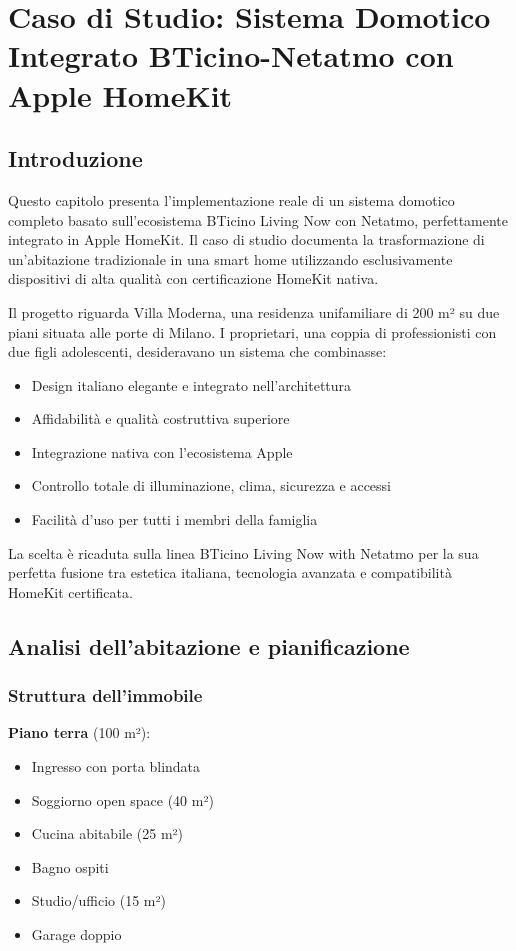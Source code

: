 \chapter{Caso di Studio: Sistema Domotico Integrato BTicino-Netatmo con Apple HomeKit}

\section{Introduzione}

Questo capitolo presenta l'implementazione reale di un sistema domotico completo basato sull'ecosistema BTicino Living Now con Netatmo, perfettamente integrato in Apple HomeKit. Il caso di studio documenta la trasformazione di un'abitazione tradizionale in una smart home utilizzando esclusivamente dispositivi di alta qualità con certificazione HomeKit nativa.

Il progetto riguarda Villa Moderna, una residenza unifamiliare di 200 m² su due piani situata alle porte di Milano. I proprietari, una coppia di professionisti con due figli adolescenti, desideravano un sistema che combinasse:

\begin{itemize}
    \item Design italiano elegante e integrato nell'architettura
    \item Affidabilità e qualità costruttiva superiore
    \item Integrazione nativa con l'ecosistema Apple
    \item Controllo totale di illuminazione, clima, sicurezza e accessi
    \item Facilità d'uso per tutti i membri della famiglia
\end{itemize}

La scelta è ricaduta sulla linea BTicino Living Now with Netatmo per la sua perfetta fusione tra estetica italiana, tecnologia avanzata e compatibilità HomeKit certificata.

\section{Analisi dell'abitazione e pianificazione}

\subsection{Struttura dell'immobile}

\textbf{Piano terra} (100 m²):
\begin{itemize}
    \item Ingresso con porta blindata
    \item Soggiorno open space (40 m²)
    \item Cucina abitabile (25 m²)
    \item Bagno ospiti
    \item Studio/ufficio (15 m²)
    \item Garage doppio
\end{itemize}

